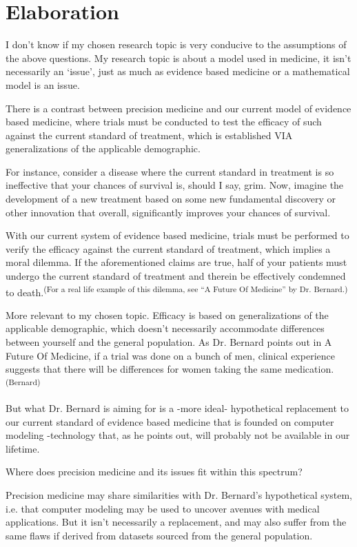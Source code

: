 \section*{Elaboration}

I don’t know if my chosen research topic is very conducive to the assumptions of the above questions. My research topic is about a model used in medicine, it isn’t necessarily an ‘issue’, just as much as evidence based medicine or a mathematical model is an issue.

There is a contrast between precision medicine and our current model of evidence based medicine, where trials must be conducted to test the efficacy of such against the current standard of treatment, which is established VIA generalizations of the applicable demographic.

For instance, consider a disease where the current standard in treatment is so ineffective that your chances of survival is, should I say, grim. Now, imagine the development of a new treatment based on some new fundamental discovery or other innovation that overall, significantly improves your chances of survival. 

With our current system of evidence based medicine, trials must be performed to verify the efficacy against the current standard of treatment, which implies a moral dilemma. If the aforementioned claims are true, half of your patients must undergo the current standard of treatment and therein be effectively condemned to death.\textsuperscript{(For a real life example of this dilemma, see “A Future Of Medicine” by Dr. Bernard.)}

More relevant to my chosen topic. Efficacy is based on generalizations of the applicable demographic, which doesn’t necessarily accommodate differences between yourself and the general population. As Dr. Bernard points out in A Future Of Medicine, if a trial was done on a bunch of men, clinical experience suggests that there will be differences for women taking the same medication.\textsuperscript{(Bernard)}

But what Dr. Bernard is aiming for is a -more ideal- hypothetical replacement to our current standard of evidence based medicine that is founded on computer modeling -technology that, as he points out, will probably not be available in our lifetime.

Where does precision medicine and its issues fit within this spectrum?

Precision medicine may share similarities with Dr. Bernard’s hypothetical system, i.e. that computer modeling may be used to uncover avenues with medical applications. But it isn’t necessarily a replacement, and may also suffer from the same flaws if derived from datasets sourced from the general population. 

